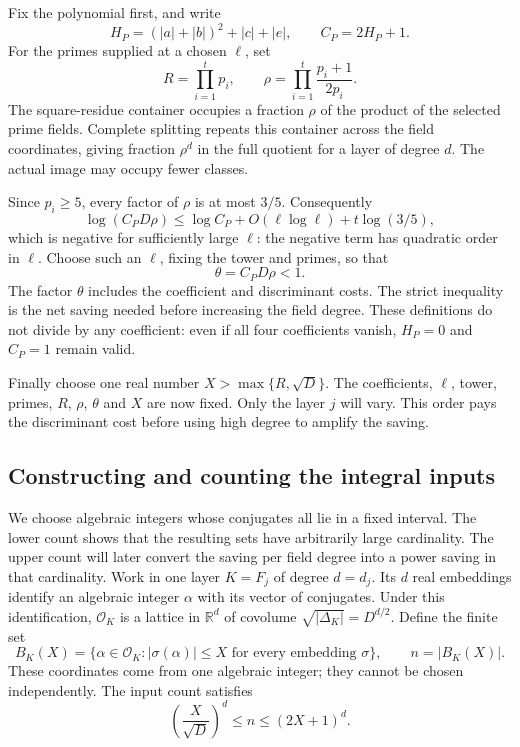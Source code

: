 Fix the polynomial first, and write
\[
H_P=(|a|+|b|)^2+|c|+|e|,
\qquad C_P=2H_P+1.
\]
For the primes supplied at a chosen $\ell$, set
\[
R=\prod_{i=1}^t p_i,
\qquad \rho=\prod_{i=1}^t\frac{p_i+1}{2p_i}.
\]
The square-residue container occupies a fraction $\rho$ of the product of the selected prime fields. Complete splitting repeats this container across the field coordinates, giving fraction $\rho^d$ in the full quotient for a layer of degree $d$. The actual image may occupy fewer classes.

Since $p_i\ge5$, every factor of $\rho$ is at most $3/5$. Consequently
\[
\log(C_PD\rho)
\le\log C_P+O(\ell\log\ell)+t\log(3/5),
\]
which is negative for sufficiently large $\ell$: the negative term has quadratic order in $\ell$. Choose such an $\ell$, fixing the tower and primes, so that
\begin{equation}
\theta=C_PD\rho<1.
\label{eq:quadratic-theta}
\end{equation}
The factor $\theta$ includes the coefficient and discriminant costs. The strict inequality is the net saving needed before increasing the field degree. These definitions do not divide by any coefficient: even if all four coefficients vanish, $H_P=0$ and $C_P=1$ remain valid.

Finally choose one real number $X>\max\{R,\sqrt D\}$. The coefficients, $\ell$, tower, primes, $R$, $\rho$, $\theta$ and $X$ are now fixed. Only the layer $j$ will vary. This order pays the discriminant cost before using high degree to amplify the saving.

\subsection{Constructing and counting the integral inputs}
\label{subsec:quadratic-inputs}

We choose algebraic integers whose conjugates all lie in a fixed interval. The lower count shows that the resulting sets have arbitrarily large cardinality. The upper count will later convert the saving per field degree into a power saving in that cardinality. Work in one layer $K=F_j$ of degree $d=d_j$. Its $d$ real embeddings identify an algebraic integer $\alpha$ with its vector of conjugates. Under this identification, $\mathcal O_K$ is a lattice in $\mathbb R^d$ of covolume $\sqrt{|\Delta_K|}=D^{d/2}$. Define the finite set
\[
B_K(X)=\{\alpha\in\mathcal O_K:
|\sigma(\alpha)|\le X\text{ for every embedding }\sigma\},
\qquad n=|B_K(X)|.
\]
These coordinates come from one algebraic integer; they cannot be chosen independently. The input count satisfies
\begin{equation}
\left(\frac X{\sqrt D}\right)^d
\le n\le(2X+1)^d.
\label{eq:quadratic-input-count}
\end{equation}


